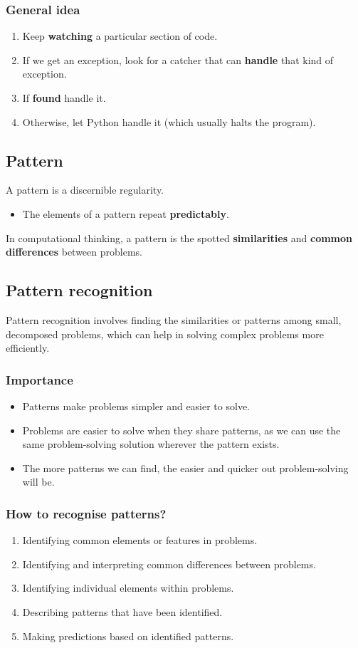 \documentclass[11pt]{article}
\begin{document}
\subsubsection{General idea}
\label{sec:orgbfee5a0}
\begin{enumerate}
\item Keep \textbf{watching} a particular section of code.
\item If we get an exception, look for a catcher that can \textbf{handle} that kind of exception.
\item If \textbf{found} handle it.
\item Otherwise, let Python handle it (which usually halts the program).
\end{enumerate}
\subsection{Pattern}
\label{sec:org1dee4b2}
A pattern is a discernible regularity.
\begin{itemize}
\item The elements of a pattern repeat \textbf{predictably}.
\end{itemize}

In computational thinking, a pattern is the spotted \textbf{similarities} and \textbf{common differences} between problems.
\subsection{Pattern recognition}
\label{sec:org0017254}
Pattern recognition involves finding the similarities or patterns among small, decomposed problems, which can help in solving complex problems more efficiently.
\subsubsection{Importance}
\label{sec:org3caa620}
\begin{itemize}
\item Patterns make problems simpler and easier to solve.
\item Problems are easier to solve when they share patterns, as we can use the same problem-solving solution wherever the pattern exists.
\item The more patterns we can find, the easier and quicker out problem-solving will be.
\end{itemize}
\subsubsection{How to recognise patterns?}
\label{sec:org6aa520d}
\begin{enumerate}
\item Identifying common elements or features in problems.
\item Identifying and interpreting common differences between problems.
\item Identifying individual elements within problems.
\item Describing patterns that have been identified.
\item Making predictions based on identified patterns.
\end{enumerate}
\end{document}
